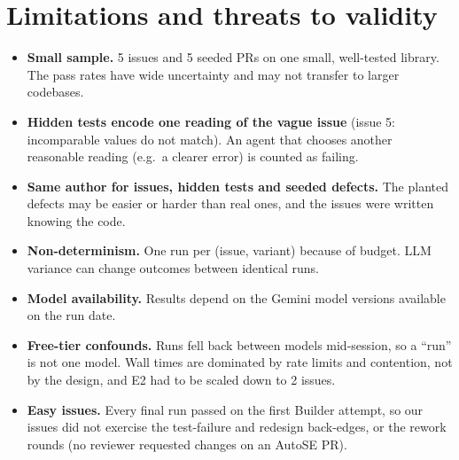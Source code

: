 \documentclass[10pt,a4paper]{article}
\begin{document}
\section{Limitations and threats to validity}
\begin{itemize}
\item \textbf{Small sample.} 5 issues and 5 seeded PRs on one small, well-tested library. The pass rates
  have wide uncertainty and may not transfer to larger codebases.
\item \textbf{Hidden tests encode one reading of the vague issue} (issue 5: incomparable values do not
  match). An agent that chooses another reasonable reading (e.g.\ a clearer error) is counted as failing.
\item \textbf{Same author for issues, hidden tests and seeded defects.} The planted defects may be easier
  or harder than real ones, and the issues were written knowing the code.
\item \textbf{Non-determinism.} One run per (issue, variant) because of budget. LLM variance can change
  outcomes between identical runs.
\item \textbf{Model availability.} Results depend on the Gemini model versions available on the run date.
\item \textbf{Free-tier confounds.} Runs fell back between models mid-session, so a ``run'' is not one
  model. Wall times are dominated by rate limits and contention, not by the design, and E2 had to be scaled down to 2 issues.
\item \textbf{Easy issues.} Every final run passed on the first Builder attempt, so our issues did not
  exercise the test-failure and redesign back-edges, or the rework rounds (no reviewer requested changes on an AutoSE PR).
\end{itemize}
\end{document}
